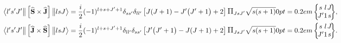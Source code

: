\begin{align*}
\braOketred{ l^{\prime} s^{\prime} J^{\prime}}{\left[\widehat{\vect{S}} \times \widehat{\vect{J}}\right]}{l s J}=\frac{i}{2}(-1)^{l+s+J^{\prime}+1} \delta_{s s^{\prime}} \delta_{l l^{\prime}}\left[J(J+1)-J^{\prime}\bigl(J^{\prime}+1\bigr)+2\right]  \Fact{J s J^{\prime}}\sqrt{ s(s+1)}
\sixj{s}{l}{J}{J^{\prime}}{1}{s},\\
\braOketred{ l^{\prime} s^{\prime} J^{\prime} }{ \left[\widehat{\vect{J}} \times \widehat{\vect{S}}\right]}{l s J}=\frac{i}{2}(-1)^{l+s+J^{\prime}+1} \delta_{l l^{\prime}} \delta_{s s^{\prime}}\left[J^{\prime}\bigl(J^{\prime}+1\bigr)-J(J+1)+2\right]  \Fact{J s J^{\prime}}\sqrt{ s(s+1)}
\sixj{s}{l}{J}{J^{\prime}}{1}{s}.
\end{align*}